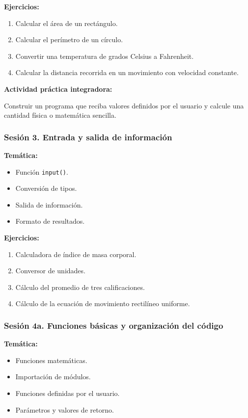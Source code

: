 \documentclass[12pt,letterpaper]{article}
\begin{document}
\textbf{Ejercicios:}
\begin{enumerate}[noitemsep]
    \item Calcular el área de un rectángulo.
    \item Calcular el perímetro de un círculo.
    \item Convertir una temperatura de grados Celsius a Fahrenheit.
    \item Calcular la distancia recorrida en un movimiento con velocidad
    constante.
\end{enumerate}

\textbf{Actividad práctica integradora:}

Construir un programa que reciba valores definidos por el usuario y
calcule una cantidad física o matemática sencilla.

\subsubsection*{Sesión 3. Entrada y salida de información}

\textbf{Temática:}
\begin{itemize}[noitemsep]
    \item Función \texttt{input()}.
    \item Conversión de tipos.
    \item Salida de información.
    \item Formato de resultados.
\end{itemize}

\textbf{Ejercicios:}
\begin{enumerate}[noitemsep]
    \item Calculadora de índice de masa corporal.
    \item Conversor de unidades.
    \item Cálculo del promedio de tres calificaciones.
    \item Cálculo de la ecuación de movimiento rectilíneo uniforme.
\end{enumerate}

\subsubsection*{Sesión 4a. Funciones básicas y organización del código}

\textbf{Temática:}
\begin{itemize}[noitemsep]
    \item Funciones matemáticas.
    \item Importación de módulos.
    \item Funciones definidas por el usuario.
    \item Parámetros y valores de retorno.
\end{itemize}
\end{document}
